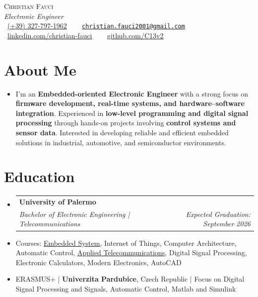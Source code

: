\documentclass[letterpaper,11pt]{article}
\makeatletter
\newcommand{\resumeItem}[1]{
  \item\small{
    {#1 \vspace{0pt}}
  }
}
\newcommand{\resumeSubheading}[4]{
  \vspace{-2pt}\item
    \begin{tabular*}{1.0\textwidth}[t]{l@{\extracolsep{\fill}}r}
      \textbf{#1} & \textbf{\small #2} \\
      \textit{\small#3} & \textit{\small #4} \\
    \end{tabular*}\vspace{-7pt}
}
\newcommand{\resumeSubHeadingListStart}{\begin{itemize}[leftmargin=0.0in, label={}]}
\newcommand{\resumeSubHeadingListEnd}{\end{itemize}}\vspace{0pt}
\newcommand{\resumeItemListStart}{\begin{itemize}}
\newcommand{\resumeItemListEnd}{\end{itemize}\vspace{-5pt}}
\makeatother
\begin{document}
\begin{center}
    {\Large \scshape Christian Fauci} \\[2mm]
    {\normalsize \itshape Electronic Engineer } \\[2mm]
    {\footnotesize 
    \raisebox{-0.1\height}{\faPhone} \ \underline{(+39) 327-797-1962} \ ~
    \raisebox{-0.1\height}{\faEnvelope} \ \underline{\href{mailto:christian.fauci2001@gmail.com}{\texttt{christian.fauci2001@gmail.com}}} \ ~
    \raisebox{-0.1\height}{\faLinkedin} \ \underline{\href{https://www.linkedin.com/in/christian-fauci/}{linkedin.com/christian-fauci}} \ ~
    \raisebox{-0.1\height}{\faGithub} \ \underline{\href{https://github.com/C13v2?tab=repositories}{github.com/C13v2}}
    }
\end{center}


\section{About Me}
\resumeSubHeadingListStart
  \item{
    {I'm an \textbf{Embedded-oriented Electronic Engineer} with a strong focus on \textbf{firmware development, real-time systems, and hardware–software integration}. Experienced in \textbf{low-level programming and digital signal processing} through hands-on projects involving \textbf{control systems and sensor data}. Interested in developing reliable and efficient embedded solutions in industrial, automotive, and semiconductor environments.
  }}
\resumeSubHeadingListEnd
\vspace{-12pt}


\section{Education} 
\resumeSubHeadingListStart
  \resumeSubheading
    {University of Palermo}{}
    {Bachelor of Electronic Engineering | Telecommunications}{ Expected Graduation: September 2026}
\resumeSubHeadingListEnd

\resumeItemListStart
  \resumeItem {Courses: 
    \href{https://github.com/C13v2/Embedded-Projects}{Embedded System}, 
    Internet of Things, 
    Computer Architecture, 
    Automatic Control, 
    \href{https://github.com/C13v2/CiscoPacketTracer}{Applied Telecommunications}, 
    Digital Signal Processing, 
    Electronic Calculators, 
    Modern Electronics, 
    AutoCAD
  }
  \resumeItem {ERASMUS+ | \textbf{Univerzita Pardubice}, Czech Republic | 
    Focus on Digital Signal Processing and Signals, Automatic Control, Matlab and Simulink
  }
\resumeItemListEnd
\vspace{-12pt}
\end{document}
